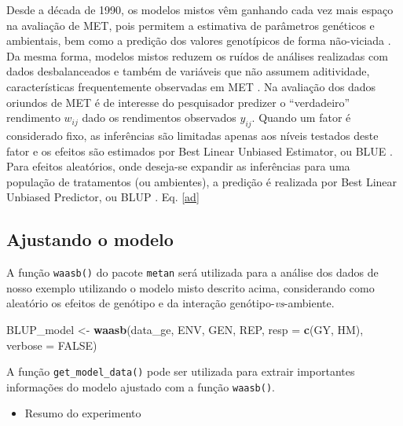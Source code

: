 \documentclass[
]{book}
\newenvironment{Shaded}{\begin{snugshade}}{\end{snugshade}}
\newcommand{\DataTypeTok}[1]{\textcolor[rgb]{0.13,0.29,0.53}{#1}}
\newcommand{\KeywordTok}[1]{\textcolor[rgb]{0.13,0.29,0.53}{\textbf{#1}}}
\newcommand{\NormalTok}[1]{#1}
\newcommand{\OtherTok}[1]{\textcolor[rgb]{0.56,0.35,0.01}{#1}}
\newcommand{\StringTok}[1]{\textcolor[rgb]{0.31,0.60,0.02}{#1}}
\providecommand{\tightlist}{%
  \setlength{\itemsep}{0pt}\setlength{\parskip}{0pt}}
\begin{document}
Desde a década de 1990, os modelos mistos vêm ganhando cada vez mais espaço na avaliação de MET, pois permitem a estimativa de parâmetros genéticos  e ambientais, bem como a predição dos valores genotípicos de forma não-viciada \citep{Smith2005}. Da mesma forma, modelos mistos reduzem os ruídos de análises realizadas com dados desbalanceados e também de variáveis que não assumem aditividade, características frequentemente observadas em MET \citep{Hu2015}. Na avaliação dos dados oriundos de MET é de interesse do pesquisador predizer o ``verdadeiro'' rendimento \(w_{ij}\) dado os rendimentos observados \(y_{ij}\). Quando um fator é considerado fixo, as inferências são limitadas apenas aos níveis testados deste fator e os efeitos são estimados por Best Linear Unbiased Estimator, ou BLUE . Para efeitos aleatórios, onde deseja-se expandir as inferências para uma população de tratamentos (ou ambientes), a predição é realizada por Best Linear Unbiased Predictor, ou BLUP  \citep{Henderson1975}.
Eq. \ref{ad}

\hypertarget{ajustando-o-modelo}{%
\subsection{Ajustando o modelo}\label{ajustando-o-modelo}}

A função \texttt{waasb()}  do pacote \texttt{metan} será utilizada para a análise dos dados de nosso exemplo utilizando o modelo misto descrito acima, considerando como aleatório os efeitos de genótipo e da interação genótipo-\emph{vs}-ambiente.

\begin{Shaded}
\begin{Highlighting}[]

\NormalTok{BLUP_model <-}\StringTok{ }\KeywordTok{waasb}\NormalTok{(data_ge, ENV, GEN, REP,}
                    \DataTypeTok{resp =} \KeywordTok{c}\NormalTok{(GY, HM),}
                    \DataTypeTok{verbose =} \OtherTok{FALSE}\NormalTok{)}
\end{Highlighting}
\end{Shaded}

A função \texttt{get\_model\_data()} pode ser utilizada para extrair importantes informações do modelo ajustado com a função \texttt{waasb()}.

\begin{itemize}
\tightlist
\item
  Resumo do experimento
\end{itemize}
\end{document}

